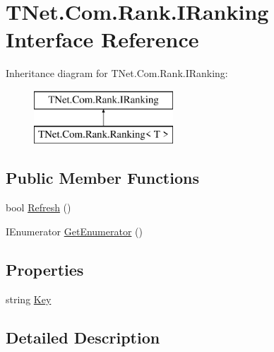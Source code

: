 \hypertarget{interface_t_net_1_1_com_1_1_rank_1_1_i_ranking}{}\section{T\+Net.\+Com.\+Rank.\+I\+Ranking Interface Reference}
\label{interface_t_net_1_1_com_1_1_rank_1_1_i_ranking}


 


Inheritance diagram for T\+Net.\+Com.\+Rank.\+I\+Ranking\+:\begin{figure}[H]
\begin{center}
\leavevmode
\includegraphics[height=2.000000cm]{interface_t_net_1_1_com_1_1_rank_1_1_i_ranking}
\end{center}
\end{figure}
\subsection*{Public Member Functions}
\begin{DoxyCompactItemize}
\item 
bool \mbox{\hyperlink{interface_t_net_1_1_com_1_1_rank_1_1_i_ranking_afe72ec8ff768035ea3747fe935e01893}{Refresh}} ()
\item 
I\+Enumerator \mbox{\hyperlink{interface_t_net_1_1_com_1_1_rank_1_1_i_ranking_ade93bc13af64d753103e3aa4d94b0d76}{Get\+Enumerator}} ()
\end{DoxyCompactItemize}
\subsection*{Properties}
\begin{DoxyCompactItemize}
\item 
string \mbox{\hyperlink{interface_t_net_1_1_com_1_1_rank_1_1_i_ranking_ad63f39092f304f103b07ad7194b58c91}{Key}}
\end{DoxyCompactItemize}


\subsection{Detailed Description}




